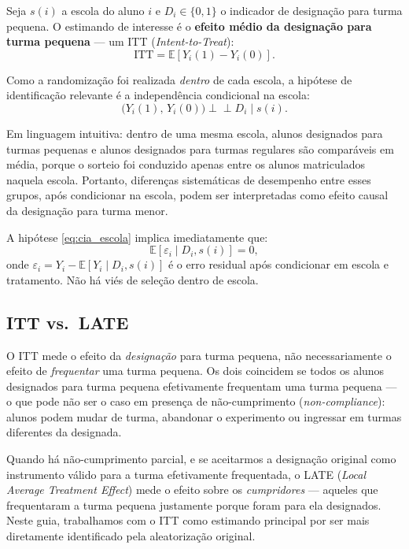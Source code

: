Seja $s(i)$ a escola do aluno $i$ e $D_i \in \{0,1\}$ o indicador de designação para turma pequena. O estimando de interesse é o \textbf{efeito médio da designação para turma pequena} --- um ITT (\textit{Intent-to-Treat}):
\begin{equation}
  \text{ITT} = \mathbb{E}[Y_i(1) - Y_i(0)].
  \label{eq:itt_star}
\end{equation}

Como a randomização foi realizada \textit{dentro} de cada escola, a hipótese de identificação relevante é a independência condicional na escola:
\begin{equation}
  \bigl(Y_i(1),\, Y_i(0)\bigr) \perp\!\!\!\perp D_i \;\big|\; s(i).
  \label{eq:cia_escola}
\end{equation}

Em linguagem intuitiva: dentro de uma mesma escola, alunos designados para turmas pequenas e alunos designados para turmas regulares são comparáveis em média, porque o sorteio foi conduzido apenas entre os alunos matriculados naquela escola. Portanto, diferenças sistemáticas de desempenho entre esses grupos, após condicionar na escola, podem ser interpretadas como efeito causal da designação para turma menor.

A hipótese \eqref{eq:cia_escola} implica imediatamente que:
\begin{equation}
  \mathbb{E}[\varepsilon_i \mid D_i, s(i)] = 0,
  \label{eq:exog_escola}
\end{equation}
onde $\varepsilon_i = Y_i - \mathbb{E}[Y_i \mid D_i, s(i)]$ é o erro residual após condicionar em escola e tratamento. Não há viés de seleção dentro de escola.

\subsection*{ITT vs.\ LATE}

O ITT mede o efeito da \textit{designação} para turma pequena, não necessariamente o efeito de \textit{frequentar} uma turma pequena. Os dois coincidem se todos os alunos designados para turma pequena efetivamente frequentam uma turma pequena --- o que pode não ser o caso em presença de não-cumprimento (\textit{non-compliance}): alunos podem mudar de turma, abandonar o experimento ou ingressar em turmas diferentes da designada.

Quando há não-cumprimento parcial, e se aceitarmos a designação original como instrumento válido para a turma efetivamente frequentada, o LATE (\textit{Local Average Treatment Effect}) mede o efeito sobre os \textit{cumpridores} --- aqueles que frequentaram a turma pequena justamente porque foram para ela designados. Neste guia, trabalhamos com o ITT como estimando principal por ser mais diretamente identificado pela aleatorização original.

